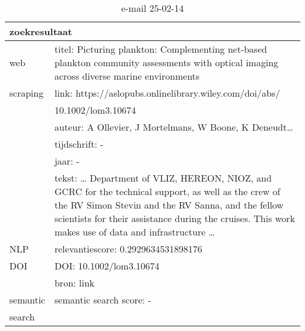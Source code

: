 \begin{table}[h!]
    \caption{e-mail 25-02-14}
    \centering
    \begin{tabularx}{\textwidth}{|p{4cm}|X|} 
        \hline
        \multicolumn{2}{|X|}{\textbf{zoekresultaat}} \\
        \hline
        web &titel: Picturing plankton: Complementing net‐based plankton community assessments with optical imaging across diverse marine environments\\
        scraping&link: https://aslopubs.onlinelibrary.wiley.com/doi/abs/\\&10.1002/lom3.10674\\
        &auteur: A Ollevier, J Mortelmans, W Boone, K Deneudt…\\
        &tijdschrift: -\\
        &jaar: -\\
        &tekst: … Department of VLIZ, HEREON, NIOZ, and GCRC for the technical support, as well as the crew of the RV Simon Stevin and the RV Sanna, and the fellow scientists for their assistance during the cruises. This work makes use of data and infrastructure …\\
        \hline
        NLP&relevantiescore: 0.2929634531898176\\
        \hline
        DOI&DOI: 10.1002/lom3.10674\\
        &bron: link\\
        \hline
        semantic&semantic search score: -\\
        search&\\
        \hline
    \end{tabularx}
    \label{table:email20250214}
\end{table}
